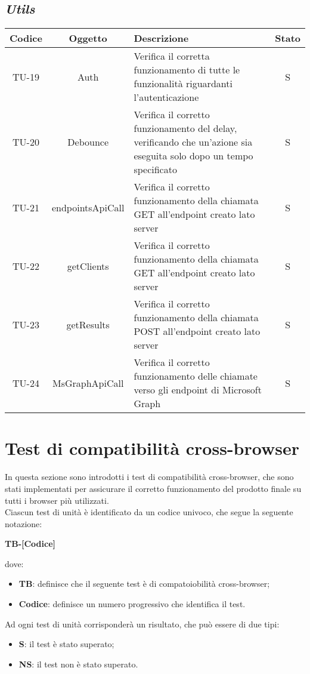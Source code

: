 \subsection*{\emph{Utils}}


\begin{center}
  \label{tab:test-unita-utils}
  \begin{longtable}{|c|c|p{}|c|}
  \hline
  \textbf{Codice} & \textbf{Oggetto} & \textbf{Descrizione} & \textbf{Stato}\\
  \hline
  TU-19 &Auth &Verifica il corretta funzionamento di tutte le funzionalità riguardanti l'autenticazione & S \\
  \hline
  TU-20 &Debounce &Verifica il corretto funzionamento del delay, verificando che un'azione sia eseguita solo dopo un tempo specificato &S \\
  \hline
  TU-21 &endpointsApiCall &Verifica il corretto funzionamento della chiamata GET all'endpoint creato lato server &S \\
  \hline
  TU-22 &getClients &Verifica il corretto funzionamento della chiamata GET all'endpoint creato lato server  &S \\
  \hline
  TU-23 &getResults &Verifica il corretto funzionamento della chiamata POST all'endpoint creato lato server &S \\
  \hline
  TU-24 &MsGraphApiCall &Verifica il corretto funzionamento delle chiamate verso gli endpoint di Microsoft Graph &S \\
  \hline
\end{longtable}
\end{center}

\section{Test di compatibilità cross-browser}
In questa sezione sono introdotti i test di compatibilità cross-browser, che sono stati implementati per assicurare il corretto funzionamento del prodotto finale su tutti i browser più utilizzati.\\
Ciascun test di unità è identificato da un codice univoco, che segue la seguente notazione:
\begin{center}
  \textbf{TB-[Codice]}
\end{center}
dove:
\begin{itemize}
  \item \textbf{TB}: definisce che il seguente test è di compatoiobilità cross-browser;
  \item \textbf{Codice}: definisce un numero progressivo che identifica il test.
\end{itemize}
Ad ogni test di unità corrisponderà un risultato, che può essere di due tipi:
\begin{itemize}
  \item \textbf{S}: il test è stato superato;
  \item \textbf{NS}: il test non è stato superato.
\end{itemize}

